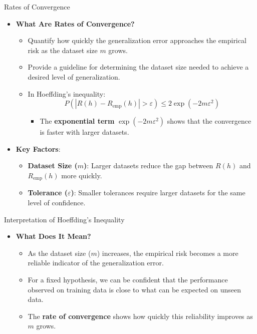 \documentclass[
  ignorenonframetext,
]{beamer}
\providecommand{\tightlist}{%
  \setlength{\itemsep}{0pt}\setlength{\parskip}{0pt}}\usepackage{longtable,booktabs,array}
\begin{document}
\begin{frame}{Rates of Convergence}
\label{rates-of-convergence}
\begin{itemize}
\tightlist
\item
  \textbf{What Are Rates of Convergence?}

  \begin{itemize}
  \tightlist
  \item
    Quantify how quickly the generalization error approaches the
    empirical risk as the dataset size \(m\) grows.
  \item
    Provide a guideline for determining the dataset size needed to
    achieve a desired level of generalization.
  \item
    In Hoeffding's inequality: \[
    P(|R(h) - R_{\text{emp}}(h)| > \varepsilon) \leq 2 \exp(-2m\varepsilon^2)
    \]

    \begin{itemize}
    \tightlist
    \item
      The \textbf{exponential term} \(\exp(-2m\varepsilon^2)\) shows
      that the convergence is faster with larger datasets.
    \end{itemize}
  \end{itemize}
\item
  \textbf{Key Factors}:

  \begin{itemize}
  \tightlist
  \item
    \textbf{Dataset Size (\(m\))}: Larger datasets reduce the gap
    between \(R(h)\) and \(R_{\text{emp}}(h)\) more quickly.
  \item
    \textbf{Tolerance (\(\varepsilon\))}: Smaller tolerances require
    larger datasets for the same level of confidence.
  \end{itemize}
\end{itemize}
\end{frame}

\begin{frame}{Interpretation of Hoeffding's Inequality}
\label{interpretation-of-hoeffdings-inequality}
\begin{itemize}
\tightlist
\item
  \textbf{What Does It Mean?}

  \begin{itemize}
  \tightlist
  \item
    As the dataset size (\(m\)) increases, the empirical risk becomes a
    more reliable indicator of the generalization error.
  \item
    For a fixed hypothesis, we can be confident that the performance
    observed on training data is close to what can be expected on unseen
    data.
  \item
    The \textbf{rate of convergence} shows how quickly this reliability
    improves as \(m\) grows.
  \end{itemize}
\end{itemize}
\end{frame}
\end{document}
